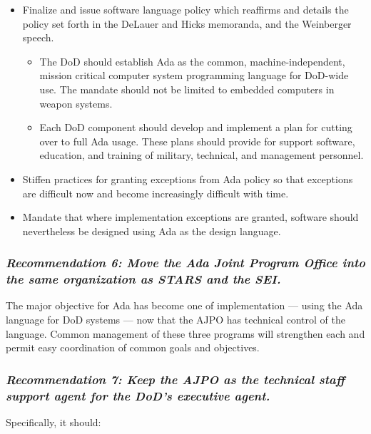 \documentclass[11pt,final]{article}
\begin{document}
\begin{itemize}
    \item Finalize and issue software language policy which reaffirms and
        details the policy set forth in the DeLauer and Hicks memoranda, and
        the Weinberger speech.
\begin{itemize}
    \item The DoD should establish Ada as the common, machine-independent,
        mission critical computer system programming language for DoD-wide use.
        The mandate should not be limited to embedded computers in weapon
        systems.
    \item Each DoD component should develop and implement a plan for cutting
        over to full Ada usage. These plans should provide for support
        software, education, and training of military, technical, and
        management personnel.
\end{itemize}
    \item Stiffen practices for granting exceptions from Ada policy so that
        exceptions are difficult now and become increasingly difficult with
        time.
    \item Mandate that where implementation exceptions are granted, software
        should nevertheless be designed using Ada as the design language.
\end{itemize}

\label{rec:6}
\subsubsection*{\textit{Recommendation 6: Move the Ada Joint Program Office
into the same organization as STARS and the SEI.}}

The major objective for Ada has become one of implementation — using the Ada
language for DoD systems — now that the AJPO has technical control of the
language. Common management of these three programs will strengthen each and
permit easy coordination of common goals and objectives.

\label{rec:7}
\subsubsection*{\textit{Recommendation 7: Keep the AJPO as the technical staff support agent
for the DoD’s executive agent.}}

Specifically, it should:
\end{document}
